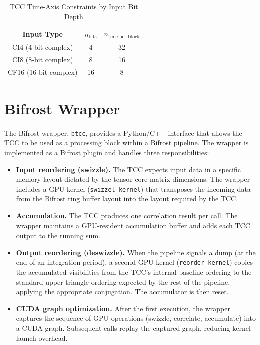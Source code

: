 \begin{table}[htbp]
    \centering
    \caption{TCC Time-Axis Constraints by Input Bit Depth}
    \label{tab:tcc-ntime}
    \begin{tabular}{ccc}
        \toprule
        \textbf{Input Type} & $n_\mathrm{bits}$ & $n_\mathrm{time\_per\_block}$ \\
        \midrule
        CI4 (4-bit complex)  & 4  & 32 \\
        CI8 (8-bit complex)  & 8  & 16 \\
        CF16 (16-bit complex) & 16 & 8 \\
        \bottomrule
    \end{tabular}
\end{table}

\section{Bifrost Wrapper}

The Bifrost wrapper, \texttt{btcc}, provides a Python/C++ interface that allows the TCC to be used as a processing block within a Bifrost pipeline.  The wrapper is implemented as a Bifrost plugin and handles three responsibilities:

\begin{itemize}
    \item \textbf{Input reordering (swizzle).}  The TCC expects input data in a specific memory layout dictated by the tensor core matrix dimensions.  The wrapper includes a GPU kernel (\texttt{swizzel\_kernel}) that transposes the incoming data from the Bifrost ring buffer layout into the layout required by the TCC.
    \item \textbf{Accumulation.}  The TCC produces one correlation result per call.  The wrapper maintains a GPU-resident accumulation buffer and adds each TCC output to the running sum.
    \item \textbf{Output reordering (deswizzle).}  When the pipeline signals a dump (at the end of an integration period), a second GPU kernel (\texttt{reorder\_kernel}) copies the accumulated visibilities from the TCC's internal baseline ordering to the standard upper-triangle ordering expected by the rest of the pipeline, applying the appropriate conjugation.  The accumulator is then reset.
    \item \textbf{CUDA graph optimization.}  After the first execution, the wrapper captures the sequence of GPU operations (swizzle, correlate, accumulate) into a CUDA graph.  Subsequent calls replay the captured graph, reducing kernel launch overhead.
\end{itemize}

